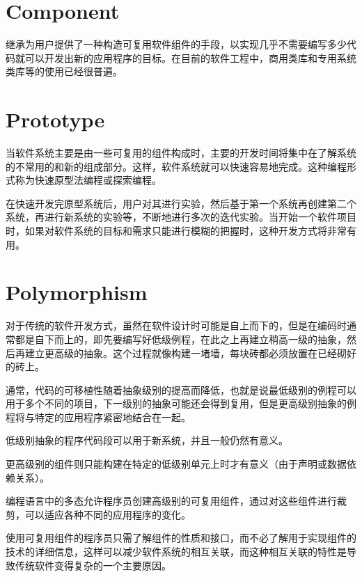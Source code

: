 \section{Component}

继承为用户提供了一种构造可复用软件组件的手段，以实现几乎不需要编写多少代码就可以开发出新的应用程序的目标。在目前的软件工程中，商用类库和专用系统类库等的使用已经很普遍。

\section{Prototype}

当软件系统主要是由一些可复用的组件构成时，主要的开发时间将集中在了解系统的不常用的和新的组成部分。这样，软件系统就可以快速容易地完成。这种编程形式称为快速原型法编程或探索编程。

在快速开发完原型系统后，用户对其进行实验，然后基于第一个系统再创建第二个系统，再进行新系统的实验等，不断地进行多次的迭代实验。当开始一个软件项目时，如果对软件系统的目标和需求只能进行模糊的把握时，这种开发方式将非常有用。


\section{Polymorphism}

对于传统的软件开发方式，虽然在软件设计时可能是自上而下的，但是在编码时通常都是自下而上的，即先要编写好低级例程，在此之上再建立稍高一级的抽象，然后再建立更高级的抽象。这个过程就像构建一堵墙，每块砖都必须放置在已经砌好的砖上。

通常，代码的可移植性随着抽象级别的提高而降低，也就是说最低级别的例程可以用于多个不同的项目，下一级别的抽象可能还会得到复用，但是更高级别抽象的例程将与特定的应用程序紧密地结合在一起。

\begin{compactitem}
\item 低级别抽象的程序代码段可以用于新系统，并且一般仍然有意义。
\item 更高级别的组件则只能构建在特定的低级别单元上时才有意义（由于声明或数据依赖关系）。
\end{compactitem}

编程语言中的多态允许程序员创建高级别的可复用组件，通过对这些组件进行裁剪，可以适应各种不同的应用程序的变化。

使用可复用组件的程序员只需了解组件的性质和接口，而不必了解用于实现组件的技术的详细信息，这样可以减少软件系统的相互关联，而这种相互关联的特性是导致传统软件变得复杂的一个主要原因。


